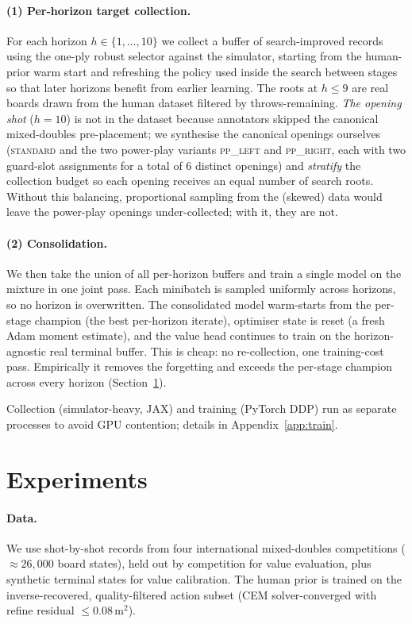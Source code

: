 \documentclass[11pt]{article}
\begin{document}
\paragraph{(1) Per-horizon target collection.}
For each horizon $h\in\{1,\ldots,10\}$ we collect a buffer of search-improved
records using the one-ply robust selector against the simulator, starting
from the human-prior warm start and refreshing the policy used inside the
search between stages so that later horizons benefit from earlier learning.
The roots at $h\le 9$ are real boards drawn from the human dataset filtered
by throws-remaining. \emph{The opening shot} ($h=10$) is not in the dataset
because annotators skipped the canonical mixed-doubles pre-placement; we
synthesise the canonical openings ourselves (\textsc{standard} and the two
power-play variants \textsc{pp\_left} and \textsc{pp\_right}, each with two
guard-slot assignments for a total of 6 distinct openings) and
\emph{stratify} the collection budget so each opening receives an equal
number of search roots. Without this balancing, proportional sampling from
the (skewed) data would leave the power-play openings under-collected; with
it, they are not.

\paragraph{(2) Consolidation.}
We then take the union of all per-horizon buffers and train a single model
on the mixture in one joint pass. Each minibatch is sampled uniformly across
horizons, so no horizon is overwritten. The consolidated model warm-starts
from the per-stage champion (the best per-horizon iterate), optimiser state
is reset (a fresh Adam moment estimate), and the value head continues to
train on the horizon-agnostic real terminal buffer. This is cheap: no
re-collection, one training-cost pass. Empirically it removes the forgetting
and exceeds the per-stage champion across every horizon
(Section~\ref{sec:exp}).

Collection (simulator-heavy, JAX) and training (PyTorch DDP) run as separate
processes to avoid GPU contention; details in Appendix~\ref{app:train}.

\section{Experiments}
\label{sec:exp}

\paragraph{Data.}
We use shot-by-shot records from four international mixed-doubles
competitions ($\approx 26{,}000$ board states), held out by competition for
value evaluation, plus synthetic terminal states for value calibration. The
human prior is trained on the inverse-recovered, quality-filtered action
subset (CEM solver-converged with refine residual $\le 0.08\,\text{m}^2$).
\end{document}
